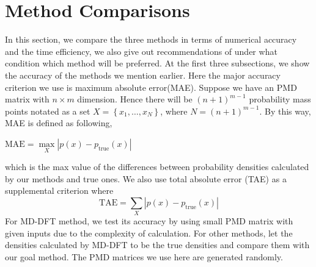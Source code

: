 \documentclass[12pt]{article}
\begin{document}
\section{Method Comparisons}\label{sec:Method Comparisons}
In this section, we compare the three methods in terms of numerical accuracy and the time efficiency, we also give out recommendations of under what condition which method will be preferred. At the first three subsections, we show the accuracy of the methods we mention earlier. Here the major accuracy criterion we use is maximum absolute error(MAE). Suppose we have an PMD matrix with $n\times m$ dimension. Hence there will be $(n+1)^{m-1}$ probability mass points notated as a set $X = \left\{x_1,\dots,x_{N}\right\}$, where $N=(n+1)^{m-1}$. By this way, MAE is defined as following,
\begin{center}
$\mathrm{MAE} = \underset{X}{\max}|p(x) - p_{\text{true}}(x)|$
\end{center}
which is the max value of the differences between probability densities calculated by our methods and true ones.
We also use total absolute error (TAE) as a supplemental criterion where
\begin{equation*}
    \mbox{TAE} = \sum_X |p(x) - p_{\text{true}}(x)|
\end{equation*}
For MD-DFT method, we test its accuracy by using small PMD matrix with given inputs due to the complexity of calculation. For other methods, let the densities calculated by MD-DFT to be the true densities and compare them with our goal method. The PMD matrices we use here are generated randomly.





\end{document}

